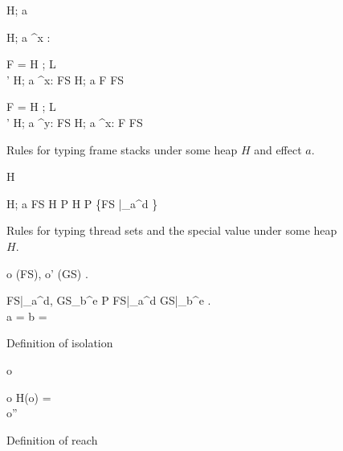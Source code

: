 \begin{figure}
  {H; a \vdash \varepsilon}

  \RuleSpace{}

  {H; a \vdash^{x : \sigma} \varepsilon}

  \RuleSpace{}

  { F =  \andalso H \vdash \Gamma; L \\
   \andalso \sigma' \stof \sigma \andalso H; a \vdash^{x: \sigma} FS }
  { H; a \vdash F \circ FS }
  
  \RuleSpace{}

  { F =  \andalso H \vdash \Gamma; L \\
   \andalso \sigma' \stof \sigma 
  \andalso H; a \vdash^{y: \sigma} FS }
  { H; a \vdash^{x: \tau} F \circ FS }

  \caption{Rules for typing frame stacks under some heap $H$ and effect $a$.}
  \label{fig:fs_typing}
\end{figure}

\begin{figure}
  {H \vdash \emptyset}

  \RuleSpace{}

  { H; a \vdash FS \andalso H \vdash P }
  { H \vdash P \cup \left\{FS |_a^d \right\} }

  \caption{Rules for typing thread sets and the special value \Error{} under some heap $H$.}
  \label{fig:ts_typing}
\end{figure}

\begin{figure}
  { 
    \forall o \in \accRoots(FS), o' \in \accRoots(GS) . \: 
  }
  {
  }
  
  \RuleSpace{}

  {
    \forall FS|_a^d, GS_b^e \in P  FS|_a^d \neq GS|_b^e . \\
    a = \ocap \: \lor \: b = \ocap \implies {}
  }
  {
  }
  \caption{Definition of isolation}
  \label{fig:def_isolation}
\end{figure}

\begin{figure}
  {o \in {}}
  {}

  \RuleSpace{}

  {
    o \in {} \andalso H(o) =  \\
    o'' \in {} \andalso {}
  }
  {  }
  \caption{Definition of reach}
  \label{fig:def_reach}
\end{figure}

